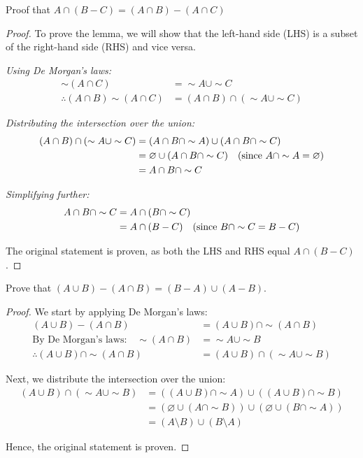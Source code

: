 \begin{exercise}
    Proof that \( A \cap (B - C) = (A \cap B) - (A \cap C) \)
\end{exercise}
\begin{proof}
     To prove the lemma, we will show that the left-hand side (LHS) is a subset of the right-hand side (RHS) and vice versa.

\textit{Using De Morgan's laws:}
\begin{align*}
    \sim (A \cap C) &= \sim A \cup \sim C \\
    \therefore (A \cap B) \sim (A \cap C) &= (A \cap B) \cap (\sim A \cup \sim C)
\end{align*}

\textit{Distributing the intersection over the union:}
\begin{align*}
    (A \cap B) \cap (\sim A \cup \sim C) &= (A \cap B \cap \sim A) \cup (A \cap B \cap \sim C) \\
    &= \varnothing \cup (A \cap B \cap \sim C) \quad \text{(since \( A \cap \sim A = \varnothing \))} \\
    &= A \cap B \cap \sim C
\end{align*}

\textit{Simplifying further:}
\begin{align*}
    A \cap B \cap \sim C &= A \cap (B \cap \sim C) \\
    &= A \cap (B - C) \quad \text{(since \( B \cap \sim C = B - C \))}
\end{align*}

The original statement is proven, as both the LHS and RHS equal \( A \cap (B - C) \).
\end{proof}
\begin{exercise}
   Prove that  \( (A \cup B) - (A \cap B) = (B - A) \cup (A - B) \).
\end{exercise}
\begin{proof}
    We start by applying De Morgan's laws:
\begin{align*}
    (A \cup B) - (A \cap B) &= (A \cup B) \cap \sim (A \cap B) \\
    \text{By De Morgan's laws:} \quad \sim (A \cap B) &= \sim A \cup \sim B \\
    \therefore (A \cup B) \cap \sim (A \cap B) &= (A \cup B) \cap (\sim A \cup \sim B)
\end{align*}

Next, we distribute the intersection over the union:
\begin{align*}
    (A \cup B) \cap (\sim A \cup \sim B) &= ((A \cup B) \cap \sim A) \cup ((A \cup B) \cap \sim B) \\
    &= (\varnothing \cup (A \cap \sim B)) \cup (\varnothing \cup (B \cap \sim A)) \\
    &= (A \setminus B) \cup (B \setminus A)
\end{align*}

Hence, the original statement is proven.
\end{proof}

